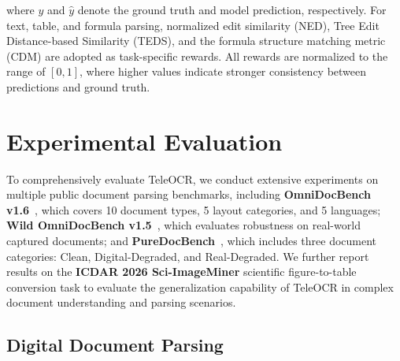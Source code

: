 \documentclass{fairmeta}
\begin{document}
where $y$ and $\hat{y}$ denote the ground truth and model prediction, respectively. For text, table, and formula parsing, normalized edit similarity (NED), Tree Edit Distance-based Similarity (TEDS), and the formula structure matching metric (CDM) are adopted as task-specific rewards. All rewards are normalized to the range of $[0,1]$, where higher values indicate stronger consistency between predictions and ground truth.

\section{Experimental Evaluation}
To comprehensively evaluate TeleOCR, we conduct extensive experiments on multiple public document parsing benchmarks, including \textbf{OmniDocBench v1.6}~\cite{wang2026mineru2}, which covers 10 document types, 5 layout categories, and 5 languages; \textbf{Wild OmniDocBench v1.5}~\cite{li2026towards}, which evaluates robustness on real-world captured documents; and \textbf{PureDocBench}~\cite{li2026far}, which includes three document categories: Clean, Digital-Degraded, and Real-Degraded. We further report results on the \textbf{ICDAR 2026 Sci-ImageMiner} scientific figure-to-table conversion task to evaluate the generalization capability of TeleOCR in complex document understanding and parsing scenarios.

\subsection{Digital Document Parsing}
\end{document}
